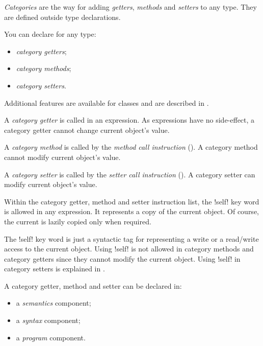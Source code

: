 



\emph{Categories} are the way for adding \emph{getters}, \emph{methods} and \emph{setters} to any type. They are defined outside type declarations.

You can declare for any type:
\begin{itemize}
\item \emph{category getters};
\item \emph{category methods};
\item \emph{category setters}.
\end{itemize}

Additional features are available for classes and are described in .


A \emph{category getter} is called in an expression. As expressions have no side-effect, a category getter cannot change current object's value.

A \emph{category method} is called by the \emph{method call instruction} (). A category method cannot modify current object's value.

A \emph{category setter} is called by the \emph{setter call instruction} (). A category setter can modify current object's value.

Within the category getter, method and setter instruction list, the \ggsq!self! key word is allowed in any expression. It represents a copy of the current object. Of course, the current is lazily copied only when required.

The  \ggsq!self! key word is just a syntactic tag for representing a write or a read/write access to the current object. Using  \ggsq!self! is not allowed in category methods and category getters since they cannot modify the current object. Using  \ggsq!self! in category setters is explained in .


A category getter, method and setter can be declared in:
\begin{itemize}
\item a \emph{semantics} component;
\item a \emph{syntax} component;
\item a \emph{program} component.
\end{itemize}

